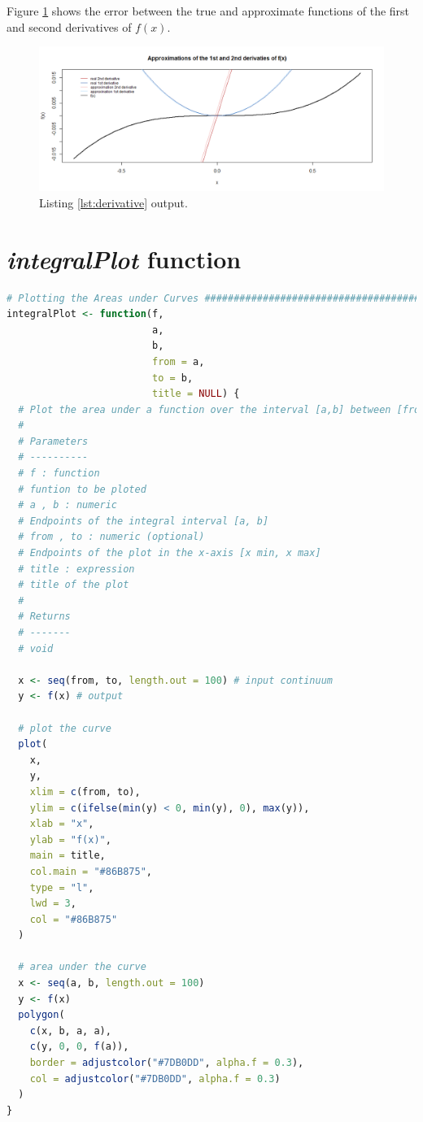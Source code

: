 \documentclass[11pt,a4paper]{article}
\begin{document}
Figure \ref{fig:plotderivs} shows the error between the true and approximate functions of the first and second derivatives of $ f(x) $.

\begin{figure}[!h]
\centering
\includegraphics[width=\textwidth]{./img/1and2_derivatives.png}
\caption{Listing \ref{lst:derivative} output.\label{fig:plotderivs}}
\end{figure}


\clearpage
\printbibliography

\appendix %

\clearpage

\section{\emph{integralPlot} function}\label{sec:appends}

\begin{lstlisting}[frame=trBL, language=R]
# Plotting the Areas under Curves ######################################
integralPlot <- function(f,
                         a,
                         b,
                         from = a,
                         to = b,
                         title = NULL) {
  # Plot the area under a function over the interval [a,b] between [from,to].
  #
  # Parameters
  # ----------
  # f : function
  # funtion to be ploted
  # a , b : numeric
  # Endpoints of the integral interval [a, b]
  # from , to : numeric (optional)
  # Endpoints of the plot in the x-axis [x min, x max]
  # title : expression
  # title of the plot
  #
  # Returns
  # -------
  # void
  
  x <- seq(from, to, length.out = 100) # input continuum
  y <- f(x) # output
  
  # plot the curve
  plot(
    x,
    y,
    xlim = c(from, to),
    ylim = c(ifelse(min(y) < 0, min(y), 0), max(y)),
    xlab = "x",
    ylab = "f(x)",
    main = title,
    col.main = "#86B875",
    type = "l",
    lwd = 3,
    col = "#86B875"
  )
  
  # area under the curve
  x <- seq(a, b, length.out = 100)
  y <- f(x)
  polygon(
    c(x, b, a, a),
    c(y, 0, 0, f(a)),
    border = adjustcolor("#7DB0DD", alpha.f = 0.3),
    col = adjustcolor("#7DB0DD", alpha.f = 0.3)
  )
}
\end{lstlisting}
\end{document}
